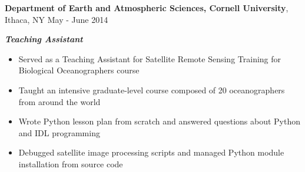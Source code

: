 
\textbf{Department of Earth and Atmospheric Sciences, Cornell University}, Ithaca, NY \hfill May - June 2014

\textbf{\textit{Teaching Assistant}}

\begin{itemize}
    \item Served as a Teaching Assistant for Satellite Remote Sensing Training for Biological Oceanographers course
    \item Taught an intensive graduate-level course composed of 20 oceanographers from around the world
    \item Wrote Python lesson plan from scratch and answered questions about Python and IDL programming
    \item Debugged satellite image processing scripts and managed Python module installation from source code
\end{itemize}
